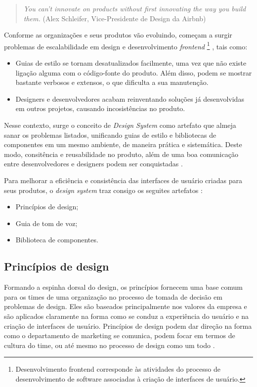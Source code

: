 \begin{quote}{\textit{You can’t innovate on products without first innovating the way you build them.}}
	(Alex Schleifer, Vice-Presidente de Design da Airbnb)
\end{quote}
 
Conforme as organizações e seus produtos vão evoluindo, começam a surgir problemas de escalabilidade em design e desenvolvimento \textit{frontend} \footnote{Desenvolvimento frontend corresponde às atividades do processo de desenvolvimento de software associadas à criação de interfaces de usuário.} \cite{curtis2010modular}, tais como:

\begin{itemize}
  \item Guias de estilo se tornam desatualizados facilmente, uma vez que não existe ligação alguma com o código-fonte do produto. Além disso, podem se mostrar bastante verbosos e extensos, o que dificulta a sua manutenção.
  \item Designers e desenvolvedores acabam reinventando soluções já desenvolvidas em outros projetos, causando incosistências no produto.
\end{itemize}

Nesse contexto, surge o conceito de \textit{Design System} como artefato que almeja sanar os problemas listados, unificando guias de estilo e bibliotecas de componentes em um mesmo ambiente, de maneira prática e sistemática. Deste modo, consitência e reusabilidade no produto, além de uma boa comunicação entre desenvolvedores e designers podem ser conquistadas \cite{curtis2010modular}.

Para melhorar a eficiência e consistência das interfaces de usuário criadas para seus produtos, o \textit{design system} traz consigo os seguites artefatos \cite{ruissalo2018operating}:

\begin{itemize}
  \item Princípios de design;
  \item Guia de tom de voz;
  \item Biblioteca de componentes.
\end{itemize}

\subsection{Princípios de design}

Formando a espinha dorsal do design, os princípios fornecem uma base comum para os times de uma organização no processo de tomada de decisão em problemas de design. Eles são baseados principalmente nos valores da empresa e são aplicados claramente na forma como se conduz a experiência do usuário e na criação de interfaces de usuário. Princípios de design podem dar direção na forma como o departamento de marketing se comunica, podem focar em termos de cultura do time, ou até mesmo no processo de design como um todo \cite{kholmatova2017design}.

